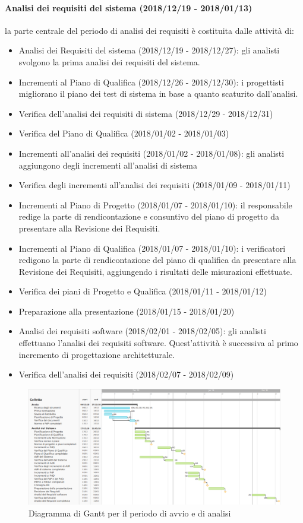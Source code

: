 		\paragraph{Analisi dei requisiti del sistema (2018/12/19 - 2018/01/13)} la parte centrale del periodo di analisi dei requisiti è costituita dalle attività di:
			\begin{itemize}
				\item Analisi dei Requisiti del sistema (2018/12/19 - 2018/12/27): gli analisti svolgono la prima analisi dei requisiti del sistema.
				\item Incrementi al Piano di Qualifica (2018/12/26 - 2018/12/30): i progettisti migliorano il piano dei test di sistema in base a quanto scaturito dall'analisi.
				\item Verifica dell'analisi dei requisiti di sistema (2018/12/29 - 2018/12/31)
				\item Verifica del Piano di Qualifica (2018/01/02 - 2018/01/03)
				\item Incrementi all'analisi dei requisiti (2018/01/02 - 2018/01/08): gli analisti aggiungono degli incrementi all'analisi di sistema
				\item Verifica degli incrementi all'analisi dei requisiti (2018/01/09 - 2018/01/11)
				\item Incrementi al Piano di Progetto (2018/01/07 - 2018/01/10): il responsabile redige la parte di rendicontazione e consuntivo del piano di progetto da presentare alla Revisione dei Requisiti.
				\item Incrementi al Piano di Qualifica (2018/01/07 - 2018/01/10): i verificatori redigono la parte di rendicontazione del piano di qualifica da presentare alla Revisione dei Requisiti, aggiungendo i risultati delle misurazioni effettuate.
				\item Verifica dei piani di Progetto e Qualifica (2018/01/11 - 2018/01/12)
				\item Preparazione alla presentazione (2018/01/15 - 2018/01/20)
				\item Analisi dei requisiti software (2018/02/01 - 2018/02/05): gli analisti effettuano l'analisi dei requisiti software. Quest'attività è successiva al primo incremento di progettazione architetturale.
				\item Verifica dell'analisi dei requisiti (2018/02/07 - 2018/02/09)				
			\end{itemize}
	\newpage
	\begin{figure}[!hbtp]
		\centering
		\includegraphics[scale=0.5,angle=90]{images/gantt.png}
		\caption{Diagramma di Gantt per il periodo di avvio e di analisi}
	\end{figure}
	\newpage
